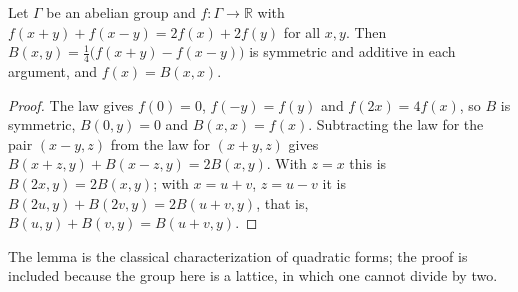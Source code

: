 \begin{lemma}\label{lem:par}
Let $\Gamma$ be an abelian group and $f\colon\Gamma\to\mathbb{R}$ with $f(x+y)+f(x-y)=2f(x)+2f(y)$ for all $x,y$. Then $B(x,y)=\tfrac14\bigl(f(x+y)-f(x-y)\bigr)$ is symmetric and additive in each argument, and $f(x)=B(x,x)$.
\end{lemma}
\begin{proof}
The law gives $f(0)=0$, $f(-y)=f(y)$ and $f(2x)=4f(x)$, so $B$ is symmetric, $B(0,y)=0$ and $B(x,x)=f(x)$. Subtracting the law for the pair $(x-y,z)$ from the law for $(x+y,z)$ gives $B(x+z,y)+B(x-z,y)=2B(x,y)$. With $z=x$ this is $B(2x,y)=2B(x,y)$; with $x=u+v$, $z=u-v$ it is $B(2u,y)+B(2v,y)=2B(u+v,y)$, that is, $B(u,y)+B(v,y)=B(u+v,y)$.
\end{proof}
The lemma is the classical characterization of quadratic forms; the proof is included because the group here is a lattice, in which one cannot divide by two.

